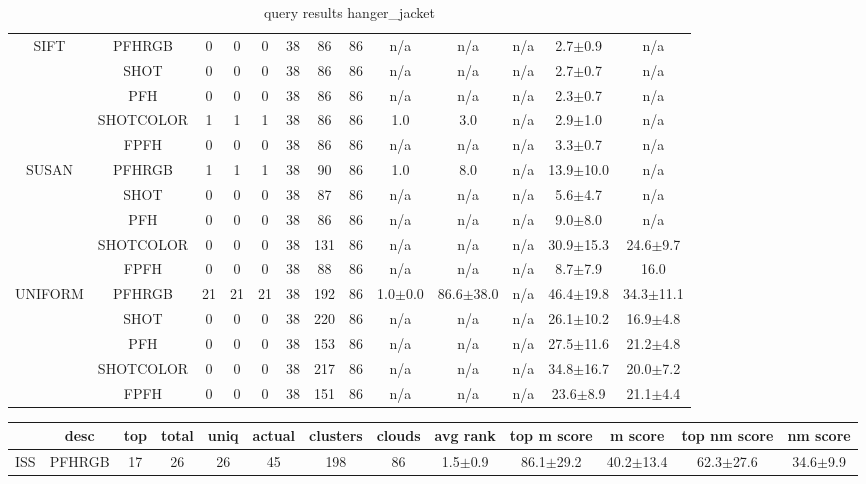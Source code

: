 \documentclass[11pt,a4paper]{kth-mag}
\begin{document}
\begin{landscape}
\begin{table}
\begin{tabular}{cc|ccccccccccc}
      \hline\multirow{5}{*}{SIFT} & PFHRGB & 0 & 0 & 0 & 38 & 86 & 86 & n/a & n/a & n/a & 2.7$\pm$0.9 & n/a\\
      &SHOT & 0 & 0 & 0 & 38 & 86 & 86 & n/a & n/a & n/a & 2.7$\pm$0.7 & n/a\\
      &PFH & 0 & 0 & 0 & 38 & 86 & 86 & n/a & n/a & n/a & 2.3$\pm$0.7 & n/a\\
      &SHOTCOLOR & 1 & 1 & 1 & 38 & 86 & 86 & 1.0 & 3.0 & n/a & 2.9$\pm$1.0 & n/a\\
      &FPFH & 0 & 0 & 0 & 38 & 86 & 86 & n/a & n/a & n/a & 3.3$\pm$0.7 & n/a\\
      \hline\multirow{5}{*}{SUSAN} & PFHRGB & 1 & 1 & 1 & 38 & 90 & 86 & 1.0 & 8.0 & n/a & 13.9$\pm$10.0 & n/a\\
      &SHOT & 0 & 0 & 0 & 38 & 87 & 86 & n/a & n/a & n/a & 5.6$\pm$4.7 & n/a\\
      &PFH & 0 & 0 & 0 & 38 & 86 & 86 & n/a & n/a & n/a & 9.0$\pm$8.0 & n/a\\
      &SHOTCOLOR & 0 & 0 & 0 & 38 & 131 & 86 & n/a & n/a & n/a & 30.9$\pm$15.3 & 24.6$\pm$9.7\\
      &FPFH & 0 & 0 & 0 & 38 & 88 & 86 & n/a & n/a & n/a & 8.7$\pm$7.9 & 16.0\\
      \hline\multirow{5}{*}{UNIFORM} & PFHRGB & 21 & 21 & 21 & 38 & 192 & 86 & 1.0$\pm$0.0 & 86.6$\pm$38.0 & n/a & 46.4$\pm$19.8 & 34.3$\pm$11.1\\
      &SHOT & 0 & 0 & 0 & 38 & 220 & 86 & n/a & n/a & n/a & 26.1$\pm$10.2 & 16.9$\pm$4.8\\
      &PFH & 0 & 0 & 0 & 38 & 153 & 86 & n/a & n/a & n/a & 27.5$\pm$11.6 & 21.2$\pm$4.8\\
      &SHOTCOLOR & 0 & 0 & 0 & 38 & 217 & 86 & n/a & n/a & n/a & 34.8$\pm$16.7 & 20.0$\pm$7.2\\
      &FPFH & 0 & 0 & 0 & 38 & 151 & 86 & n/a & n/a & n/a & 23.6$\pm$8.9 & 21.1$\pm$4.4\\
    \end{tabular}
    \caption{query results hanger_jacket}
    \label{tab:qhanger_jacket}
  \end{table}
  \begin{table}
    \begin{tabular}{cc|ccccccccccc}
      & desc & top & total & uniq & actual & clusters & clouds & avg rank & top m score & m score & top nm score & nm score\\\hline
      \multirow{5}{*}{ISS} & PFHRGB & 17 & 26 & 26 & 45 & 198 & 86 & 1.5$\pm$0.9 & 86.1$\pm$29.2 & 40.2$\pm$13.4 & 62.3$\pm$27.6 & 34.6$\pm$9.9\\

\end{tabular}
\end{table}
\end{landscape}
\end{document}

